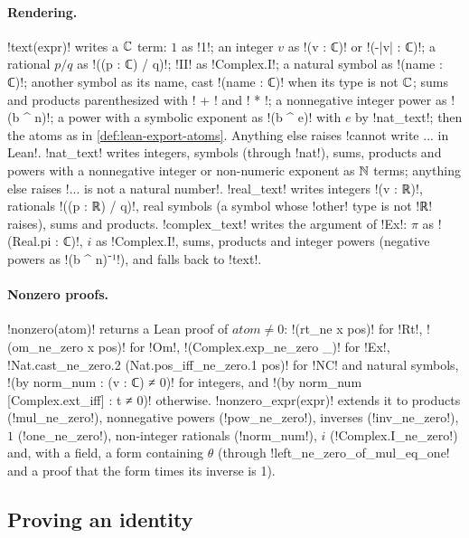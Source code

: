 {{{\paragraph{Rendering.} \lexpy!text(expr)! writes a $\mathbb{C}$ term: $1$ as \lexlean!1!; an integer $v$ as
\lexlean!(v : ℂ)! or \lexlean!(-|v| : ℂ)!; a rational $p/q$ as \lexlean!((p : ℂ) / q)!; \lexpy!II! as
\lexlean!Complex.I!; a natural symbol as \lexlean!(name : ℂ)!; another symbol as its name, cast
\lexlean!(name : ℂ)! when its type is not $\mathbb{C}$; sums and products parenthesized with
\lexcode! + ! and \lexcode! * !; a nonnegative integer power as \lexlean!(b ^ n)!; a power with a
symbolic exponent as \lexlean!(b ^ e)! with $e$ by \lexpy!nat_text!; then the atoms as in
\cref{def:lean-export-atoms}. Anything else raises \lexcode!cannot write ... in Lean!.
\lexpy!nat_text! writes integers, symbols (through \lexpy!nat!), sums, products and powers with a
nonnegative integer or non-numeric exponent as $\mathbb{N}$ terms; anything else raises \lexcode!... is not a natural number!. \lexpy!real_text! writes integers \lexlean!(v : ℝ)!, rationals
\lexlean!((p : ℝ) / q)!, real symbols (a symbol whose \lexpy!other! type is not \lexlean!ℝ! raises),
sums and products. \lexpy!complex_text! writes the argument of \lexpy!Ex!: $\pi$ as
\lexlean!(Real.pi : ℂ)!, $i$ as \lexlean!Complex.I!, sums, products and integer powers (negative
powers as \lexlean!(b ^ n)⁻¹!), and falls back to \lexpy!text!.

\paragraph{Nonzero proofs.} \lexpy!nonzero(atom)! returns a Lean proof of $\mathit{atom}\neq 0$:
\lexlean!(rt_ne x pos)! for \lexpy!Rt!, \lexlean!(om_ne_zero x pos)! for \lexpy!Om!,
\lexlean!(Complex.exp_ne_zero _)! for \lexpy!Ex!, \lexlean!Nat.cast_ne_zero.2 (Nat.pos_iff_ne_zero.1 pos)!
for \lexpy!NC! and natural symbols, \lexlean!(by norm_num : (v : ℂ) ≠ 0)! for integers, and
\lexlean!(by norm_num [Complex.ext_iff] : t ≠ 0)! otherwise. \lexpy!nonzero_expr(expr)! extends it to
products (\lexlean!mul_ne_zero!), nonnegative powers (\lexlean!pow_ne_zero!), inverses
(\lexlean!inv_ne_zero!), $1$ (\lexlean!one_ne_zero!), non-integer rationals (\lexlean!norm_num!), $i$
(\lexlean!Complex.I_ne_zero!) and, with a field, a form containing $\theta$ (through
\lexlean!left_ne_zero_of_mul_eq_one! and a proof that the form times its inverse is 1).

\subsection{Proving an identity}\label{sec:lean-export-scalar-prove}

}}}
